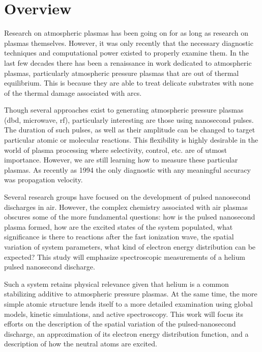\section{Overview}

Research on atmospheric plasmas has been going on for as long as research on
plasmas themselves. However, it was only recently that the necessary diagnostic
techniques and computational power existed to properly examine them. In the last
few decades there has been a renaissance in work dedicated to atmospheric
plasmas, particularly atmospheric pressure plasmas that are out of thermal
equilibrium. This is because they are able to treat delicate substrates with
none of the thermal damage associated with arcs.

Though several approaches exist to generating atmospheric pressure plasmas (dbd,
microwave, rf), particularly interesting are those using nanosecond pulses. The
duration of such pulses, as well as their amplitude can be changed to target
particular atomic or molecular reactions. This flexibility is highly desirable
in the world of plasma processing where selectivity, control, etc. are of utmost
importance. However, we are still learning how to measure these particular
plasmas. As recently as 1994 \cite{Vasilyak1994} the only diagnostic with any
meaningful accuracy was propagation velocity. 

Several research groups have focused on the development of pulsed nanosecond
discharges in air. However, the complex chemistry associated with air plasmas
obscures some of the more fundamental questions: how is the pulsed nanosecond
plasma formed, how are the excited states of the system populated, what
significance is there to reactions after the fast ionization wave, the spatial
variation of system parameters, what kind of electron energy distribution can be
expected? This study will emphasize spectroscopic measurements of a helium
pulsed nanosecond discharge.

Such a system retains physical relevance given that helium is a common
stabilizing additive to atmospheric pressure plasmas. At the same time, the more
simple atomic structure lends itself to a more detailed examination using global
models, kinetic simulations, and active spectroscopy. This work will focus its
efforts on the description of the spatial variation of the pulsed-nanosecond
discharge, an approximation of its electron energy distribution function, and a
description of how the neutral atoms are excited.

